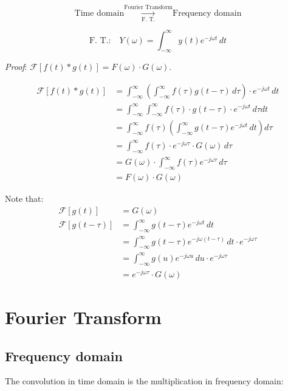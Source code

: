 \documentclass[
  letterpaper,
  DIV=11,
  numbers=noendperiod,
  oneside]{scrreprt}
\begin{document}
\[\text{Time domain} \underset{\text{F. T.}}{\overset{\text{Fourier Transform}}{\longrightarrow}} \text{Frequency domain}\]

\[\text{F. T.:}\quad Y(\omega) = \int_{-\infty}^{\infty} y(t) e^{-j\omega t} \,dt\]

\emph{Proof}: \(\mathcal{F}[f(t) * g(t)] = F(\omega) \cdot G(\omega)\).

\begin{align*}
\mathcal{F}[f(t) * g(t)] &= \int_{-\infty}^{\infty} \left(\int_{-\infty}^{\infty} f(\tau)g(t-\tau) \,d\tau\right) \cdot e^{-j\omega t} \,dt \\
&= \int_{-\infty}^{\infty} \int_{-\infty}^{\infty} f(\tau) \cdot g(t-\tau) \cdot e^{-j\omega t} \,d\tau dt \\
&= \int_{-\infty}^{\infty} f(\tau) \left( \int_{-\infty}^{\infty} g(t-\tau) e^{-j\omega t} \,dt \right) d\tau \\
&= \int_{-\infty}^{\infty} f(\tau) \cdot e^{-j\omega \tau} \cdot G(\omega) \,d\tau \tag{see note below} \\
&= G(\omega) \cdot \int_{-\infty}^{\infty} f(\tau) e^{-j\omega \tau} \,d\tau \\
&= F(\omega) \cdot G(\omega)
\end{align*}

Note that: \begin{align*}
    \mathcal{F}[g(t)] &= G(\omega) \\
    \mathcal{F}[g(t-\tau)] &= \int_{-\infty}^{\infty} g(t-\tau) e^{-j\omega t} \,dt \\
    &= \int_{-\infty}^{\infty} g(t-\tau) e^{-j\omega (t-\tau)} \,dt \cdot e^{-j\omega \tau} \\
    &= \int_{-\infty}^{\infty} g(u) e^{-j\omega u} \,du \cdot e^{-j\omega \tau} \tag{let $u = t-\tau$} \\
    &= e^{-j\omega \tau} \cdot G(\omega)
\end{align*}


\chapter{Fourier Transform}\label{fourier-transform}

\section{Frequency domain}\label{frequency-domain}

The convolution in time domain is the multiplication in frequency
domain:
\end{document}

